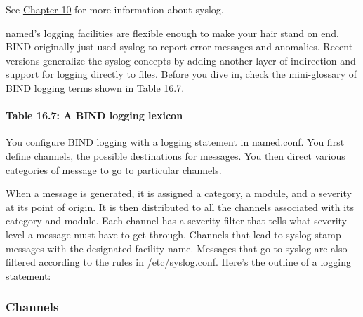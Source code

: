\leavevmode\hypertarget{part0024_split_070.htmlux5cux23_idContainer1053}{}%
See
\protect\hyperlink{part0017_split_000.htmlux5cux23_idTextAnchor493}{Chapter
10} for more information about syslog.

{\protect\hypertarget{part0024_split_070.htmlux5cux23_idIndexMarker2283}{}{}}{named}'s
logging facilities are flexible enough to make your hair stand on end.
BIND
\protect\hypertarget{part0024_split_070.htmlux5cux23_idIndexMarker2284}{}{}originally
just used syslog to report error messages and anomalies. Recent versions
generalize the syslog concepts by adding another layer of indirection
and support for logging directly to files. Before you dive in, check the
mini-glossary of BIND logging terms shown in
\protect\hyperlink{part0024_split_070.htmlux5cux23_idTextAnchor956}{Table
16.7}.

\paragraph[{Table 16.7: }A BIND logging lexicon]{\texorpdfstring{{Table
16.7:
}\protect\hypertarget{part0024_split_070.htmlux5cux23_idTextAnchor956}{}{}A
BIND logging lexicon}{Table 16.7: A BIND logging lexicon}}


You configure BIND logging with a {logging }statement in {named.conf}.
You first define channels, the possible destinations for messages. You
then direct various categories of message to go to particular channels.

When a message is generated, it is assigned a category, a module, and a
severity at its point of origin. It is then distributed to all the
channels associated with its category and module. Each channel has a
severity filter that tells what severity level a message must have to
get through. Channels that lead to syslog stamp messages with the
designated facility name. Messages that go to syslog are also filtered
according to the rules in {/etc/syslog.conf}. Here's the outline of a
{logging}
statement:\protect\hypertarget{part0024_split_070.htmlux5cux23_idIndexMarker2285}{}{}


\subsubsection[Channels]{\texorpdfstring{\protect\hypertarget{part0024_split_070.htmlux5cux23_idTextAnchor957}{}{}Channels}{Channels}}

